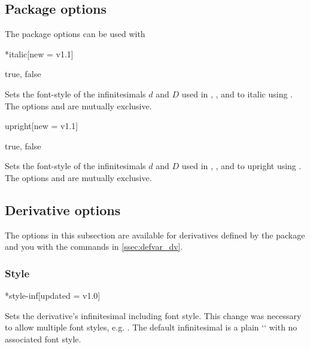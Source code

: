	\subsection{Package options}
	The package options can be used with
	\begin{center}
		\ttfamily\small
	\end{center}
	
	\begin{option}*{italic}[new = v1.1]
		\begin{values}[default = false]
			true, false
		\end{values}
		Sets the font-style of the infinitesimals $d$ and $D$ used in , ,  and  to italic using . The options  and  are mutually exclusive.
	\end{option}
	
	\begin{option}{upright}[new = v1.1]
		\begin{values}[default = true]
			true, false
		\end{values}
		Sets the font-style of the infinitesimals $d$ and $D$ used in , ,  and  to upright using . The options  and  are mutually exclusive.
	\end{option}
	
	\subsection{Derivative options} \label{ssec:options_dv}
	The options in this subsection are available for derivatives defined by the package and you with the commands in \cref{ssec:defvar_dv}.
	
	\subsubsection*{Style}
	
	\begin{option}*{style-inf}[updated = v1.0]
		\begin{values}[default = d]
		\end{values}
		Sets the derivative's infinitesimal including font style. This change was necessary to allow multiple font styles, e.g. . The default infinitesimal is a plain `` with no associated font style.
	\end{option}
	

